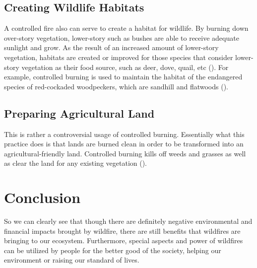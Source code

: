\documentclass[man, 11pt]{apa6}
\begin{document}
   \subsection{Creating Wildlife Habitats}
   A controlled fire also can serve to create a habitat for wildlife. By burning down over-story vegetation, lower-story 
   such as bushes are able to receive adequate sunlight and grow. As the result of an increased amount of lower-story 
   vegetation, habitats are created or improved for those species that consider lower-story vegetation as their 
   food source, such as deer, dove, quail, etc (\cite{biodiversity}). For example, controlled burning is used to maintain the habitat 
   of the endangered species of red-cockaded woodpeckers, which are sandhill and flatwoods (\cite{wildlife_habitat}).

   \subsection{Preparing Agricultural Land}
   This is rather a controversial usage of controlled burning. Essentially what this practice does is that lands are 
   burned clean in order to be transformed into an agricultural-friendly land. Controlled burning kills off weeds and 
   grasses as well as clear the land for any existing vegetation (\cite{agricultural_burning}).

  \section{Conclusion}
  So we can clearly see that though there are definitely negative environmental and financial impacts brought by wildfire,
  there are still benefits that wildfires are bringing to our ecosystem. Furthermore, special aspects and power of wildfires
  can be utilized by people for the better good of the society, helping our environment or raising our standard of lives.

  \printbibliography
  
  
  
\end{document}

